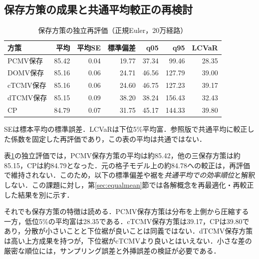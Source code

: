 \documentclass[10pt,a4paper]{article}
\numberwithin{equation}{section}
\numberwithin{table}{section}
\numberwithin{figure}{section}
\theoremstyle{plain}
\theoremstyle{definition}
\begin{document}
\subsection{保存方策の成果と共通平均較正の再検討}
\begin{table}[htbp]\centering\small
\caption{保存方策の独立再評価（正規Euler，20万経路）}\label{tab:baseline}
\begin{tabular}{lrrrrrr}
\toprule
方策 & 平均 & 平均SE & 標準偏差 & q05 & q95 & LCVaR \\ \midrule
PCMV保存 & 85.42 & 0.04 & 19.77 & 37.34 & 99.46 & 28.35 \\
DOMV保存 & 85.16 & 0.06 & 24.71 & 46.56 & 127.79 & 39.00 \\
cTCMV保存 & 85.16 & 0.06 & 24.60 & 46.75 & 127.23 & 39.17 \\
dTCMV保存 & 85.15 & 0.09 & 38.20 & 38.24 & 156.43 & 32.43 \\
CP & 84.79 & 0.07 & 31.75 & 45.17 & 144.33 & 39.80 \\
\bottomrule\end{tabular}
\par\vspace{3pt}\begin{minipage}{0.97\textwidth}\footnotesize SEは標本平均の標準誤差．LCVaRは下位5\%平均富．参照版で共通平均に較正した係数を固定した再評価であり，この表の平均は共通ではない．\end{minipage}
\end{table}
表\ref{tab:baseline}の独立評価では，PCMV保存方策の平均は約85.42，他の三保存方策は約85.15，CPは約84.79となった．元の格子モデル上の約84.78への較正は，再評価で維持されない．このため，以下の標準偏差や裾を\emph{共通平均での効率順位}と解釈しない．この課題に対し，第\ref{sec:equalmean}節では各解概念を再最適化・再較正した結果を別に示す．

それでも保存方策の特徴は読める．PCMV保存方策は分布を上側から圧縮する一方，低位5\%の平均富は28.35である．cTCMV保存方策は39.17，CPは39.80であり，分散が小さいことと下位裾が良いことは同義ではない．dTCMV保存方策は高い上方成果を持つが，下位裾がcTCMVより良いとはいえない．小さな差の厳密な順位には，サンプリング誤差と外挿誤差の検証が必要である．
\end{document}
